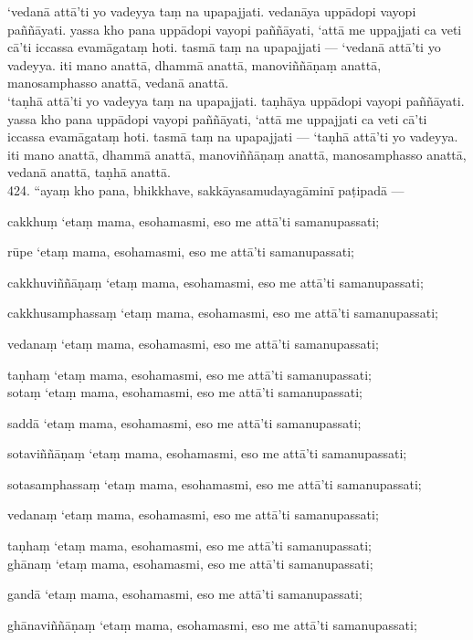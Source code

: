 \documentclass[10pt]{article}
\begin{document}
‘vedanā attā’ti yo vadeyya taṃ na upapajjati. vedanāya uppādopi vayopi paññāyati. yassa kho pana uppādopi vayopi paññāyati, ‘attā me uppajjati ca veti cā’ti iccassa evamāgataṃ hoti. tasmā taṃ na upapajjati — ‘vedanā attā’ti yo vadeyya. iti mano anattā, dhammā anattā, manoviññāṇaṃ anattā, manosamphasso anattā, vedanā anattā.\\

‘taṇhā attā’ti yo vadeyya taṃ na upapajjati. taṇhāya uppādopi vayopi paññāyati. yassa kho pana uppādopi vayopi paññāyati, ‘attā me uppajjati ca veti cā’ti iccassa evamāgataṃ hoti. tasmā taṃ na upapajjati — ‘taṇhā attā’ti yo vadeyya. iti mano anattā, dhammā anattā, manoviññāṇaṃ anattā, manosamphasso anattā, vedanā anattā, taṇhā anattā.\\

424. “ayaṃ kho pana, bhikkhave, sakkāyasamudayagāminī paṭipadā —\

cakkhuṃ ‘etaṃ mama, esohamasmi, eso me attā’ti samanupassati;\

rūpe ‘etaṃ mama, esohamasmi, eso me attā’ti samanupassati;\

cakkhuviññāṇaṃ ‘etaṃ mama, esohamasmi, eso me attā’ti samanupassati;\

cakkhusamphassaṃ ‘etaṃ mama, esohamasmi, eso me attā’ti samanupassati;\

vedanaṃ ‘etaṃ mama, esohamasmi, eso me attā’ti samanupassati;\

taṇhaṃ ‘etaṃ mama, esohamasmi, eso me attā’ti samanupassati;\\

sotaṃ ‘etaṃ mama, esohamasmi, eso me attā’ti samanupassati;\

saddā ‘etaṃ mama, esohamasmi, eso me attā’ti samanupassati;\

sotaviññāṇaṃ ‘etaṃ mama, esohamasmi, eso me attā’ti samanupassati;\

sotasamphassaṃ ‘etaṃ mama, esohamasmi, eso me attā’ti samanupassati;\

vedanaṃ ‘etaṃ mama, esohamasmi, eso me attā’ti samanupassati;\

taṇhaṃ ‘etaṃ mama, esohamasmi, eso me attā’ti samanupassati;\\

ghānaṃ ‘etaṃ mama, esohamasmi, eso me attā’ti samanupassati;\

gandā ‘etaṃ mama, esohamasmi, eso me attā’ti samanupassati;\

ghānaviññāṇaṃ ‘etaṃ mama, esohamasmi, eso me attā’ti samanupassati;\
\end{document}
